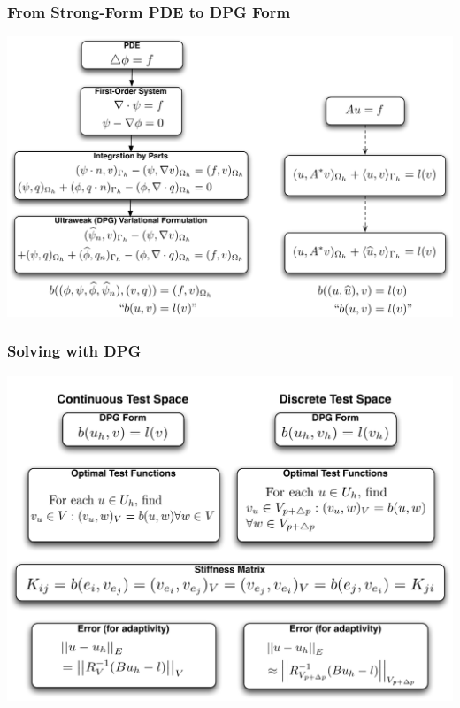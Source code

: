 \documentclass[mathserif]{beamer}
\begin{document}
\begin{frame}                                                                                                                                                                          
\frametitle{From Strong-Form PDE to DPG Form}
\begin{center}
\includegraphics[width=\linewidth]{../figures/DPGFormCartoon}\\
\end{center}
\end{frame}              
\begin{frame}                                                                                                                                                                          
\frametitle{Solving with DPG}
\begin{center} 
\includegraphics[width=0.9\linewidth]{../figures/DPGSolveCartoonNew}\\
\end{center}
\end{frame}
\end{document}
